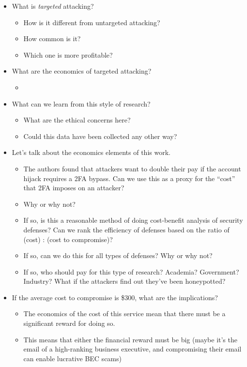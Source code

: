 \documentclass[11pt]{article}
\begin{document}
\begin{itemize}
    \item What is {\it targeted } attacking? 
    \begin{itemize}
        \item How is it different from untargeted attacking?
        \item How common is it?
        \item Which one is more profitable?
    \end{itemize}
    \item What are the economics of targeted attacking?
    \begin{itemize}
        \item 
    \end{itemize}
    \item What can we learn from this style of research?
    \begin{itemize}
        \item What are the ethical concerns here?
        \item Could this data have been collected any other way?
    \end{itemize}
    \item Let's talk about the economics elements of this work.
    \begin{itemize}
        \item The authors found that attackers want to double their pay if the account hijack requires a 2FA bypass. Can we use this as a proxy for the ``cost'' that 2FA imposes on an attacker?
        \item Why or why not?
        \item If so, is this a reasonable method of doing cost-benefit analysis of security defenses? Can we rank the efficiency of defenses based on the ratio of (cost) : (cost to compromise)?
        \item If so, can we do this for all types of defenses? Why or why not? 
        \item If so, who should pay for this type of research? Academia? Government? Industry? What if the attackers find out they've been honeypotted?
    \end{itemize}
    \item If the average cost to compromise is \$300, what are the implications?
    \begin{itemize}
        \item The economics of the cost of this service mean that there must be a significant reward for doing so.
        \item This means that either the financial reward must be big (maybe it's the email of a high-ranking business executive, and compromising their email can enable lucrative BEC scams)

\end{itemize}
\end{itemize}
\end{document}
